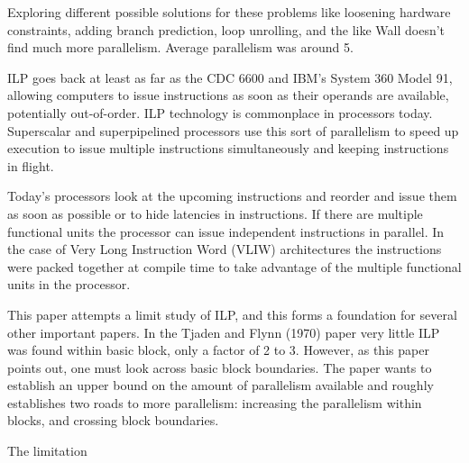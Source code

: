 Exploring different possible solutions for these problems like loosening hardware constraints, adding branch prediction, loop unrolling, and the like Wall doesn’t find much more parallelism. Average parallelism was around 5.








ILP goes back at least as far as the CDC 6600 and IBM’s System 360 Model 91, allowing computers to issue instructions as soon as their operands are available, potentially out-of-order. ILP technology is commonplace in processors today. Superscalar and superpipelined processors use this sort of parallelism to speed up execution to issue multiple instructions simultaneously and keeping instructions in flight.

Today’s processors look at the upcoming instructions and reorder and issue them as soon as possible or to hide latencies in instructions. If there are multiple functional units the processor can issue independent instructions in parallel. In the case of Very Long Instruction Word (VLIW) architectures the instructions were packed together at compile time to take advantage of the multiple functional units in the processor.

This paper attempts a limit study of ILP, and this forms a foundation for several other important papers. In the Tjaden and Flynn (1970) paper very little ILP was found within basic block, only a factor of 2 to 3. However, as this paper points out, one must look across basic block boundaries. The paper wants to establish an upper bound on the amount of parallelism available and roughly establishes two roads to more parallelism: increasing the parallelism within blocks, and crossing block boundaries.

The limitation 
